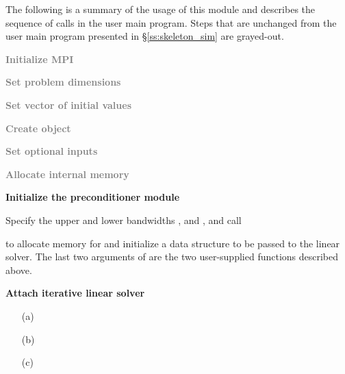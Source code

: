 The following is a summary of the usage of this module and describes the sequence 
of calls in the user main program. Steps that are unchanged from the user main
program presented in \S\ref{ss:skeleton_sim} are grayed-out.
\begin{Steps}
\item 
  \textcolor{gray}{\bf Initialize MPI}

\item
  \textcolor{gray}{\bf Set problem dimensions}

\item
  \textcolor{gray}{\bf Set vector of initial values}
 
\item
  \textcolor{gray}{\bf Create {\ida} object}

\item
  \textcolor{gray}{\bf Set optional inputs}

\item
  \textcolor{gray}{\bf Allocate internal memory}

\item \label{i:bbdpre_init}
  {\bf Initialize the {\idabbdpre} preconditioner module}

  Specify the upper and lower bandwidths ,  and
  ,  and call 


  to allocate memory for and initialize a data structure  to be 
  passed to the {\idaspgmr} linear solver. The last two arguments of 
  are the two user-supplied functions described above.

\item \label{i:bbdpre_attach}
  {\bf Attach iterative linear solver}

  \begin{itemize}
  \item[(a) ] 
  \item[(b) ] 
  \item[(c) ] 
  \end{itemize}


\end{Steps}
